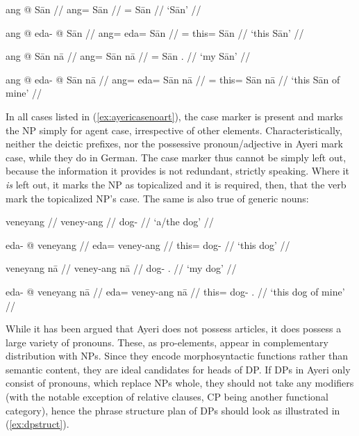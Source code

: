 \pex\label{ex:ayericasenoart}
	\a
	\begingl
		\gla ang @ Sān //
		\glb ang= Sān //
		\glc \Aarg{}= Sān //
		\glft `Sān' //
	\endgl

	\a\begingl
		\gla ang @ eda- @ Sān //
		\glb ang= eda= Sān //
		\glc \Aarg{}= this= Sān //
		\glft `this Sān' //
	\endgl

	\a\label{ex:naaadj}\begingl
		\gla ang @ Sān nā //
		\glb ang= Sān nā //
		\glc \Aarg{}= Sān \Fsg{}.\Gen{} //
		\glft `my Sān' //
	\endgl

	\a\ljudge\ques\begingl
		\gla ang @ eda- @ Sān nā //
		\glb ang= eda= Sān nā //
		\glc \Aarg{}= this= Sān nā //
		\glft `this Sān of mine' //
	\endgl
\xe

In all cases listed in (\ref{ex:ayericasenoart}), the case marker is present
and marks the NP simply for agent case, irrespective of other elements.
Characteristically, neither the deictic prefixes, nor the possessive
pronoun/adjective in Ayeri mark case, while they do in German. The case marker
thus cannot be simply left out, because the information it provides is not
redundant, strictly speaking. Where it \emph{is} left out, it marks the NP as
topicalized and it is required, then, that the verb mark the topicalized NP's
case. The same is also true of generic nouns:

\pex
	\a
	\begingl
		\gla veneyang //
		\glb veney-ang //
		\glc dog-\Aarg{} //
		\glft `a/the dog' //
	\endgl

	\a\begingl
		\gla eda- @ veneyang //
		\glb eda= veney-ang //
		\glc this= dog-\Aarg{} //
		\glft `this dog' //
	\endgl

	\a\begingl
		\gla veneyang nā //
		\glb veney-ang nā //
		\glc dog-\Aarg{} \Fsg{}.\Gen{} //
		\glft `my dog' //
	\endgl

	\a\begingl
		\gla eda- @ veneyang nā //
		\glb eda= veney-ang nā //
		\glc this= dog-\Aarg{} \Fsg{}.\Gen{} //
		\glft `this dog of mine' //
	\endgl
\xe

While it has been argued that Ayeri does not possess articles, it does possess
a large variety of pronouns. These, as pro-elements, appear in complementary
distribution with NPs. Since they encode morphosyntactic functions rather than
semantic content, they are ideal candidates for heads of DP. If DPs in Ayeri
only consist of pronouns, which replace NPs whole, they should not take any
modifiers (with the notable exception of relative clauses, CP being another
functional category), hence the phrase structure plan of DPs should look as
illustrated in (\ref{ex:dpstruct}).

